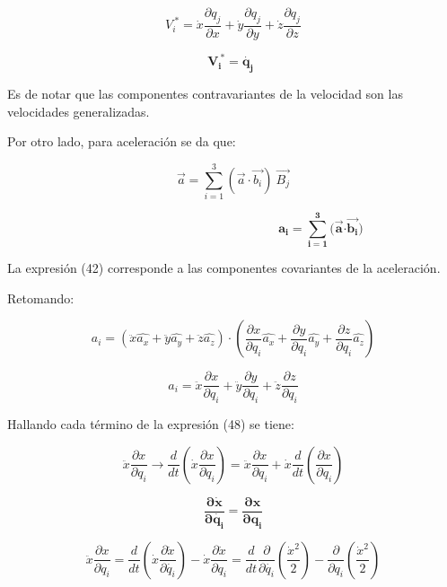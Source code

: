 \documentclass[]{article}
\begin{document}
\[V_{i}^{\ *} = \dot{x}\frac{\partial q_{j}}{\partial x} + \dot{y}\frac{\partial q_{j}}{\partial y} + \dot{z}\frac{\partial q_{j}}{\partial z}\]

\[\mathbf{V}_{\mathbf{i}}^{\mathbf{\ *}}\mathbf{=}\dot{\mathbf{q}_{\mathbf{j}}}\mathbf{\ \ }\]

Es de notar que las componentes contravariantes de la velocidad son las
velocidades generalizadas.

Por otro lado, para aceleración se da que:

\[\overrightarrow{a} = \sum_{i = 1}^{3}(\overrightarrow{a} \cdot \overrightarrow{b_{i}})\ \overrightarrow{B_{j}}\]

\[\mathbf{\ \ \ \ \ \ \ \ \ \ \ \ \ \ \ \ \ \ \ \ \ \ \ \ \ \ \ \ \ \ \ \ \ \ \ \ \ \ \ \ \ \ \ \ \ \ \ \ \ \ \ \ \ \ \ \ \ \ \ \ \ \ \ }\mathbf{a}_{\mathbf{i}}\mathbf{=}\sum_{\mathbf{i = 1}}^{\mathbf{3}}\mathbf{(}\overrightarrow{\mathbf{a}}\mathbf{\cdot}\overrightarrow{\mathbf{b}_{\mathbf{i}}}\mathbf{)}\]

La expresión (42) corresponde a las componentes covariantes de la
aceleración.

Retomando:

\[a_{i} = \left( \ddot{x}\widehat{a_{x}} + \ddot{y}\widehat{a_{y}} + \ddot{z}\widehat{a_{z}} \right) \cdot \left( \frac{\partial x}{\partial q_{i}}\widehat{a_{x}} + \frac{\partial y}{\partial q_{i}}\widehat{a_{y}} + \frac{\partial z}{\partial q_{i}}\widehat{a_{z}} \right)\]

\[a_{i} = \ddot{x}\frac{\partial x}{\partial q_{i}} + \ddot{y}\frac{\partial y}{\partial q_{i}} + \ddot{z}\frac{\partial z}{\partial q_{i}}\]

Hallando cada término de la expresión (48) se tiene:

\[\ddot{x}\frac{\partial x}{\partial q_{i}} \rightarrow \frac{d}{dt}\left( \dot{x}\frac{\partial x}{\partial q_{i}} \right) = \ddot{x}\frac{\partial x}{\partial q_{i}} + \dot{x}\frac{d}{dt}\left( \frac{\partial x}{\partial q_{i}} \right)\]

\[\frac{\mathbf{\partial}\dot{\mathbf{x}}}{\mathbf{\partial}\dot{\mathbf{q}_{\mathbf{i}}}}\mathbf{=}\frac{\mathbf{\partial x}}{\mathbf{\partial}\mathbf{q}_{\mathbf{i}}}\]

\[\ddot{x}\frac{\partial x}{\partial q_{i}} = \frac{d}{dt}\left( \dot{x}\frac{\partial\dot{x}}{\partial\dot{q_{i}}} \right) - \dot{x}\frac{\partial\dot{x}}{\partial q_{i}} = \frac{d}{dt}\frac{\partial}{\partial\dot{q_{i}}}\left( \frac{{\dot{x}}^{2}}{2} \right) - \frac{\partial}{\partial q_{i}}\left( \frac{{\dot{x}}^{2}}{2} \right)\]
\end{document}
